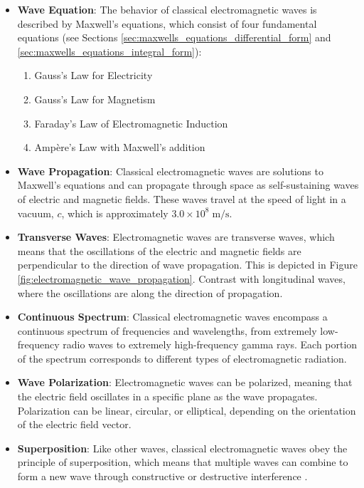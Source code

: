 \documentclass{article}
\theoremstyle{definition}
\begin{document}
\begin{itemize}
\item {\bf Wave Equation}: The behavior of classical
electromagnetic waves is described by Maxwell's equations, which
consist of four fundamental equations (see Sections 
\ref{sec:maxwells_equations_differential_form} and 
\ref{sec:maxwells_equations_integral_form}):

\begin{enumerate}
\item Gauss's Law for Electricity 
\item Gauss's Law for Magnetism
\item Faraday's Law of Electromagnetic Induction
\item Ampère's Law with Maxwell's addition
\end{enumerate}

\item {\bf Wave Propagation}: Classical electromagnetic waves are
solutions to Maxwell's equations and can propagate through space
as self-sustaining waves of electric and magnetic fields. These
waves travel at the speed of light in a vacuum, $c$, which is
approximately $3.0 \times 10^8 \; \text{m/s}$.

\item {\bf Transverse Waves}: Electromagnetic waves are
transverse waves, which means that the oscillations of the
electric and magnetic fields are perpendicular to the direction
of wave propagation. This is depicted in Figure
\ref{fig:electromagnetic_wave_propagation}. Contrast with
longitudinal waves, where the oscillations are along the 
direction of propagation.

\item {\bf Continuous Spectrum}: Classical electromagnetic waves
encompass a continuous spectrum of frequencies and wavelengths,
from extremely low-frequency radio waves to extremely
high-frequency gamma rays. Each portion of the spectrum
corresponds to different types of electromagnetic radiation.

\item {\bf Wave Polarization}: Electromagnetic waves can be
polarized, meaning that the electric field oscillates in a
specific plane as the wave propagates. Polarization can be
linear, circular, or elliptical, depending on the orientation of
the electric field vector.

\item {\bf Superposition}: Like other waves, classical
electromagnetic waves obey the principle of superposition, which
means that multiple waves can combine to form a new wave through
constructive or destructive interference \cite{dmm:bloch_sphere}.


\end{itemize}
\end{document}
